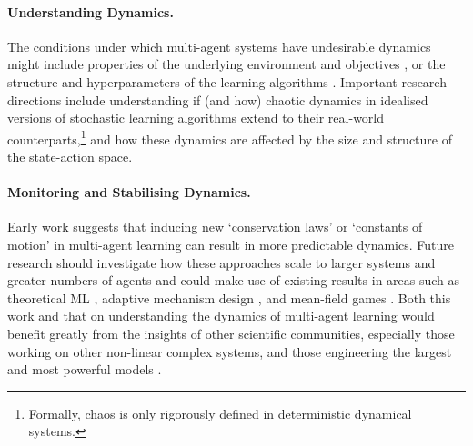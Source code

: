 \paragraph{Understanding Dynamics.}
The conditions under which multi-agent systems have undesirable dynamics might include properties of the underlying environment and objectives \citep{BarfussMann2022,Sanders2018}, or the structure and hyperparameters of the learning algorithms \citep{BarfussEtAl2019,Leonardos2022,barfuss2023intrinsic}.
Important research directions include understanding if (and how) chaotic dynamics in idealised versions of stochastic learning algorithms extend to their real-world counterparts,\footnote{Formally, chaos is only rigorously defined in deterministic dynamical systems.} and how these dynamics are affected by the size and structure of the state-action space.

\paragraph{Monitoring and Stabilising Dynamics.}
Early work suggests that inducing new `conservation laws' \citep{NagarajanEtAl2020a} or `constants of motion' \citep{Piliouras2021} in multi-agent learning can result in more predictable dynamics. 
Future research should investigate how these approaches scale to larger systems and greater numbers of agents and could make use of existing results in areas such as theoretical ML \citep{Sastry1999,Tuyls2005,Bowling2001a,Bottou2010,Kushner2003}, adaptive mechanism design \citep{Pardoe2006,Zhang2008,Baumann2020,Yang2022,Zheng2022,Gerstgrasser2023}, and mean-field games \citep{Lasry2007,Huang2006}.
Both this work and that on understanding the dynamics of multi-agent learning would benefit greatly from the insights of other scientific communities, especially those working on other non-linear complex systems, and those engineering the largest and most powerful models \citep{BarfussEtAl2024}.

